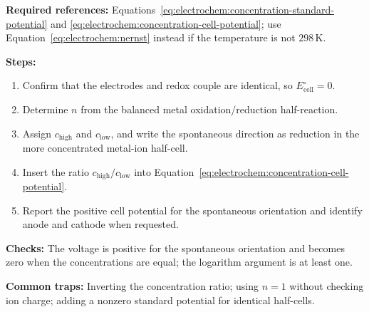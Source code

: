 \textbf{Required references:} Equations~\eqref{eq:electrochem:concentration-standard-potential} and \eqref{eq:electrochem:concentration-cell-potential}; use Equation~\eqref{eq:electrochem:nernst} instead if the temperature is not \(298\,\mathrm K\).


\textbf{Steps:}
\begin{enumerate}
    \item Confirm that the electrodes and redox couple are identical, so \(E^\circ_{\mathrm{cell}}=0\).
    \item Determine \(n\) from the balanced metal oxidation/reduction half-reaction.
    \item Assign \(c_{\mathrm{high}}\) and \(c_{\mathrm{low}}\), and write the spontaneous direction as reduction in the more concentrated metal-ion half-cell.
    \item Insert the ratio \(c_{\mathrm{high}}/c_{\mathrm{low}}\) into Equation~\eqref{eq:electrochem:concentration-cell-potential}.
    \item Report the positive cell potential for the spontaneous orientation and identify anode and cathode when requested.
\end{enumerate}

\textbf{Checks:} The voltage is positive for the spontaneous orientation and becomes zero when the concentrations are equal; the logarithm argument is at least one.

\textbf{Common traps:} Inverting the concentration ratio; using \(n=1\) without checking ion charge; adding a nonzero standard potential for identical half-cells.
